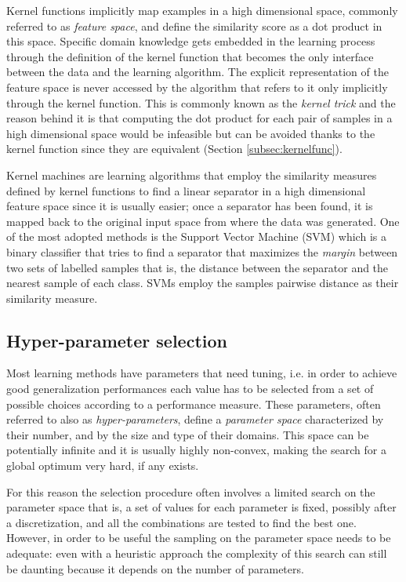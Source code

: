 Kernel functions implicitly map examples in a high dimensional space, commonly
referred to as \emph{feature space}, and define the similarity score as a dot
product in this space.
Specific domain knowledge gets embedded in the learning process through the definition
of the kernel function that becomes the only interface between the data
and the learning algorithm.
The explicit representation of the feature space is never accessed by the algorithm
that refers to it only implicitly through the kernel function.
This is commonly known as the \emph{kernel trick} and the reason behind it is 
that computing the dot product for each pair of samples in a high dimensional space
would be infeasible but can be avoided thanks to the kernel function since they are
equivalent (Section \ref{subsec:kernelfunc}).

Kernel machines are learning algorithms that employ the similarity measures defined
by kernel functions to find a linear separator in a high dimensional feature space
since it is usually easier; once a separator has been found, it is mapped back
to the original input space from where the data was generated.
One of the most adopted methods is the Support Vector Machine (SVM) \cite{Cortes&Vapnik:1995}
which is a binary classifier that tries to find a separator that maximizes the \emph{margin}
between two sets of labelled samples that is, the distance between the separator and the
nearest sample of each class.
SVMs employ the samples pairwise distance as their similarity measure.

\subsection{Hyper-parameter selection}
\label{subsec:hyper1}

Most learning methods have parameters that need tuning, i.e. in order to achieve
good generalization performances each value has to be selected from a set of
possible choices according to a performance measure.
These parameters, often referred to also as \emph{hyper-parameters}, define a
\emph{parameter space} characterized by their number, and by the size and type
of their domains.
This space can be potentially infinite and it is usually highly non-convex, making
the search for a global optimum very hard, if any exists.

For this reason the selection procedure often involves a limited search on the parameter space
that is, a set of values for each parameter is fixed, possibly after a discretization,
and all the combinations are tested to find the best one.
However, in order to be useful the sampling on the parameter space needs to be adequate:
even with a heuristic approach the complexity of this search can still be daunting because
it depends on the number of parameters.

